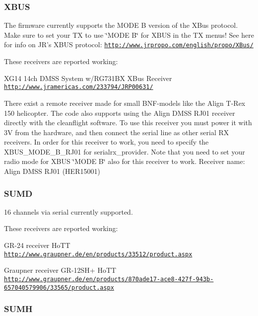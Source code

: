 \subsubsection*{X\+B\+U\+S}

The firmware currently supports the M\+O\+D\+E B version of the X\+Bus protocol. Make sure to set your T\+X to use \char`\"{}\+M\+O\+D\+E B\char`\"{} for X\+B\+U\+S in the T\+X menus! See here for info on J\+R's X\+B\+U\+S protocol\+: \href{http://www.jrpropo.com/english/propo/XBus/}{\tt http\+://www.\+jrpropo.\+com/english/propo/\+X\+Bus/}

These receivers are reported working\+:

X\+G14 14ch D\+M\+S\+S System w/\+R\+G731\+B\+X X\+Bus Receiver \href{http://www.jramericas.com/233794/JRP00631/}{\tt http\+://www.\+jramericas.\+com/233794/\+J\+R\+P00631/}

There exist a remote receiver made for small B\+N\+F-\/models like the Align T-\/\+Rex 150 helicopter. The code also supports using the Align D\+M\+S\+S R\+J01 receiver directly with the cleanflight software. To use this receiver you must power it with 3\+V from the hardware, and then connect the serial line as other serial R\+X receivers. In order for this receiver to work, you need to specify the X\+B\+U\+S\+\_\+\+M\+O\+D\+E\+\_\+\+B\+\_\+\+R\+J01 for serialrx\+\_\+provider. Note that you need to set your radio mode for X\+B\+U\+S \char`\"{}\+M\+O\+D\+E B\char`\"{} also for this receiver to work. Receiver name\+: Align D\+M\+S\+S R\+J01 (H\+E\+R15001)

\subsubsection*{S\+U\+M\+D}

16 channels via serial currently supported.

These receivers are reported working\+:

G\+R-\/24 receiver Ho\+T\+T \href{http://www.graupner.de/en/products/33512/product.aspx}{\tt http\+://www.\+graupner.\+de/en/products/33512/product.\+aspx}

Graupner receiver G\+R-\/12\+S\+H+ Ho\+T\+T \href{http://www.graupner.de/en/products/870ade17-ace8-427f-943b-657040579906/33565/product.aspx}{\tt http\+://www.\+graupner.\+de/en/products/870ade17-\/ace8-\/427f-\/943b-\/657040579906/33565/product.\+aspx}

\subsubsection*{S\+U\+M\+H}

